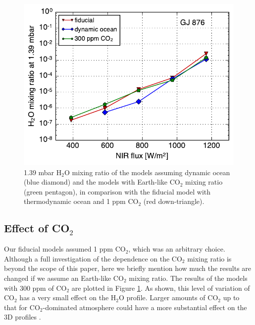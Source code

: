 \documentclass[11pt,numberedappendix,twocolappendix,]{emulateapj}
\def\water{H$_2$O }
\begin{document}
\begin{figure}[!h]
    \begin{center}
    \includegraphics[width=0.9\hsize]{fig/xH2O_sensitivity.pdf}
    \end{center}
\caption{1.39 mbar \water mixing ratio of the models assuming dynamic ocean (blue diamond) and the models with Earth-like CO$_2$ mixing ratio (green pentagon), in comparison with the fiducial model with thermodynamic ocean and 1 ppm CO$_2$ (red down-triangle). }
\label{fig:change_ocean}
\end{figure}

\subsection{Effect of CO$_2$}
\label{ss:sensitivity_ocean}

Our fiducial models assumed 1 ppm CO$_2$, which was an arbitrary choice. 
Although a full investigation of the dependence on the CO$_2$ mixing ratio is beyond the scope of this paper, here we briefly mention how much the results are changed if we assume an Earth-like CO$_2$ mixing ratio. 
The results of the models with 300 ppm of CO$_2$ are plotted in Figure \ref{fig:change_ocean}. 
As shown, this level of variation of CO$_2$ has a very small effect on the \water profile. 
Larger amounts of CO$_2$ up to that for CO$_2$-dominated atmosphere could have a more substantial effect on the 3D profiles \citep{Wordsworth2013}. 


\end{document}
